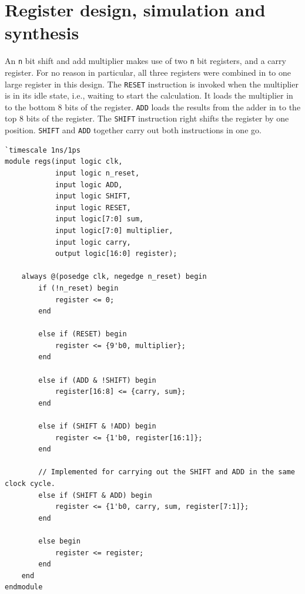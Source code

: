 \documentclass[a4paper,11pt]{article}
\begin{document}
\section{Register design, simulation and synthesis}
An \lstinline{n} bit shift and add multiplier makes use of two \lstinline{n} bit registers, and a carry register. For no reason in particular, all three registers were combined in to one large register in this design. The \lstinline{RESET} instruction is invoked when the multiplier is in its idle state, i.e., waiting to start the calculation. It loads the multiplier in to the bottom 8 bits of the register. \lstinline{ADD} loads the results from the adder in to the top 8 bits of the register. The \lstinline{SHIFT} instruction right shifts the register by one position. \lstinline{SHIFT} and \lstinline{ADD} together carry out both instructions in one go.

\begin{lstlisting}
`timescale 1ns/1ps
module regs(input logic clk, 
            input logic n_reset,
            input logic ADD,
            input logic SHIFT,
            input logic RESET,
            input logic[7:0] sum,
            input logic[7:0] multiplier,
            input logic carry,
            output logic[16:0] register);

    always @(posedge clk, negedge n_reset) begin
        if (!n_reset) begin
            register <= 0;
        end
        
        else if (RESET) begin
            register <= {9'b0, multiplier};
        end
            
        else if (ADD & !SHIFT) begin
            register[16:8] <= {carry, sum};
        end
            
        else if (SHIFT & !ADD) begin
            register <= {1'b0, register[16:1]};
        end
		
        // Implemented for carrying out the SHIFT and ADD in the same clock cycle.
		else if (SHIFT & ADD) begin
            register <= {1'b0, carry, sum, register[7:1]};
        end
        
        else begin
            register <= register;
        end
    end
endmodule
\end{lstlisting}
\end{document}
